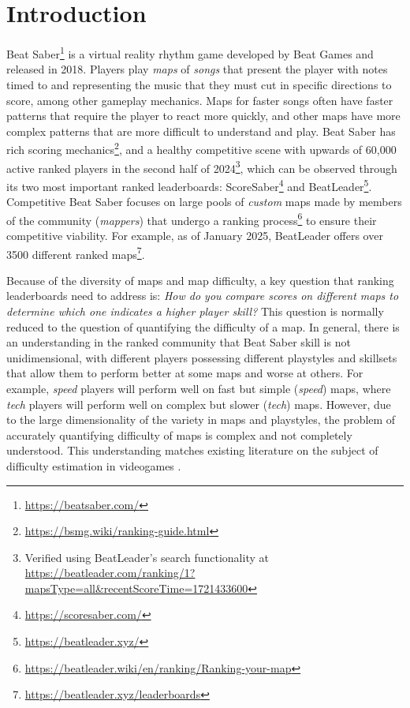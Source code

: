 \documentclass[12pt,a4paper]{article}
\begin{document}
\section{Introduction}

Beat Saber\footnote{\url{https://beatsaber.com/}} is a virtual reality rhythm game developed by Beat Games and released in 2018. Players play {\emph{maps}} of {\emph{songs}} that present the player with notes timed to and representing the music that they must cut in specific directions to score, among other gameplay mechanics. Maps for faster songs often have faster patterns that require the player to react more quickly, and other maps have more complex patterns that are more difficult to understand and play. Beat Saber has rich scoring mechanics\footnote{\url{https://bsmg.wiki/ranking-guide.html}}, and a healthy competitive scene with upwards of 60,000 active ranked players in the second half of 2024\footnote{Verified using BeatLeader's search functionality at \url{https://beatleader.com/ranking/1?mapsType=all&recentScoreTime=1721433600}}, which can be observed through its two most important ranked leaderboards: ScoreSaber\footnote{\url{https://scoresaber.com/}} and BeatLeader\footnote{\url{https://beatleader.xyz/}}. Competitive Beat Saber focuses on large pools of {\emph{custom}} maps made by members of the community ({\emph{mappers}}) that undergo a ranking process\footnote{\url{https://beatleader.wiki/en/ranking/Ranking-your-map}} to ensure their competitive viability. For example, as of January 2025, BeatLeader offers over 3500 different ranked maps\footnote{\url{https://beatleader.xyz/leaderboards}}.

Because of the diversity of maps and map difficulty, a key question that ranking leaderboards need to address is: {\emph{How do you compare scores on different maps to determine which one indicates a higher player skill?}} This question is normally reduced to the question of quantifying the difficulty of a map. In general, there is an understanding in the ranked community that Beat Saber skill is not unidimensional, with different players possessing different playstyles and skillsets that allow them to perform better at some maps and worse at others. For example, {\emph{speed}} players will perform well on fast but simple ({\emph{speed}}) maps, where {\emph{tech}} players will perform well on complex but slower ({\emph{tech}}) maps. However, due to the large dimensionality of the variety in maps and playstyles, the problem of accurately quantifying difficulty of maps is complex and not completely understood. This understanding matches existing literature on the subject of difficulty estimation in videogames \cite{measuring_difficulty_single_player_games,measuring_difficulty_platform_games}.\\
\end{document}
